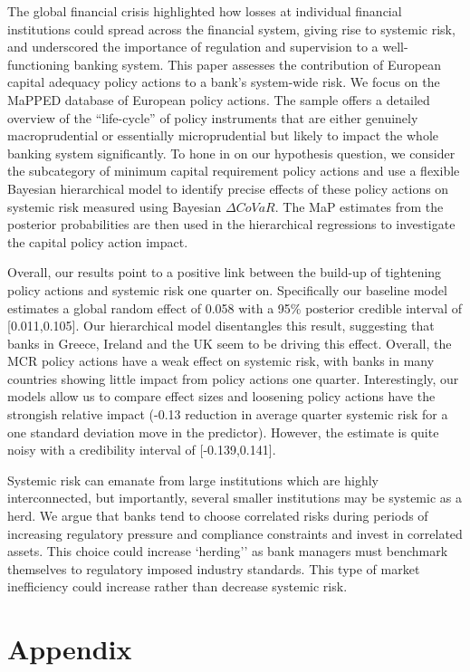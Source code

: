 \documentclass[
  10pt,
]{article}
\begin{document}
The global financial crisis highlighted how losses at individual
financial institutions could spread across the financial system, giving
rise to systemic risk, and underscored the importance of regulation and
supervision to a well-functioning banking system. This paper assesses
the contribution of European capital adequacy policy actions to a bank's
system-wide risk. We focus on the MaPPED database of European policy
actions. The sample offers a detailed overview of the ``life-cycle'' of
policy instruments that are either genuinely macroprudential or
essentially microprudential but likely to impact the whole banking
system significantly. To hone in on our hypothesis question, we consider
the subcategory of minimum capital requirement policy actions and use a
flexible Bayesian hierarchical model to identify precise effects of
these policy actions on systemic risk measured using Bayesian
\(\Delta CoVaR\). The MaP estimates from the posterior probabilities are
then used in the hierarchical regressions to investigate the capital
policy action impact.

Overall, our results point to a positive link between the build-up of
tightening policy actions and systemic risk one quarter on. Specifically
our baseline model estimates a global random effect of 0.058 with a 95\%
posterior credible interval of {[}0.011,0.105{]}. Our hierarchical model
disentangles this result, suggesting that banks in Greece, Ireland and
the UK seem to be driving this effect. Overall, the MCR policy actions
have a weak effect on systemic risk, with banks in many countries
showing little impact from policy actions one quarter. Interestingly,
our models allow us to compare effect sizes and loosening policy actions
have the strongish relative impact (-0.13 reduction in average quarter
systemic risk for a one standard deviation move in the predictor).
However, the estimate is quite noisy with a credibility interval of
{[}-0.139,0.141{]}.

Systemic risk can emanate from large institutions which are highly
interconnected, but importantly, several smaller institutions may be
systemic as a herd. We argue that banks tend to choose correlated risks
during periods of increasing regulatory pressure and compliance
constraints and invest in correlated assets. This choice could increase
`herding'' as bank managers must benchmark themselves to regulatory
imposed industry standards. This type of market inefficiency could
increase rather than decrease systemic risk.

\hypertarget{appendix}{%
\section{Appendix}\label{appendix}}
\end{document}
